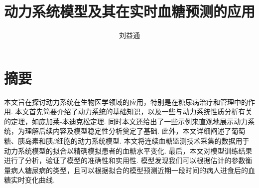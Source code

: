 \confidential{}%
\title{动力系统模型及其在实时血糖预测的应用}%
\author{刘益通}%
\advisorsec{}%
\englishdate{\quad / \quad /\quad}%

\chapter*{摘\quad 要}%
\setcounter{page}{1}%

本文旨在探讨动力系统在生物医学领域的应用，特别是在糖尿病治疗和管理中的作用. 本文首先简要介绍了动力系统的基础知识，以及一些与动力系统性质分析有关的定理，如庞加莱-本迪克松定理. 同时本文还给出了一些示例来直观地展示动力系统，为理解后续内容及模型稳定性分析奠定了基础. 此外，本文详细阐述了葡萄糖、胰岛素和胰$\beta$细胞的动力系统模型. 本文将连续血糖监测技术采集的数据用于动力系统模型的拟合以精确模拟患者的血糖水平变化. 最后，本文对模型训练结果进行了分析，验证了模型的准确性和实用性. 模型发现我们可以根据估计的参数衡量病人糖尿病的类型，且可以根据拟合的模型预测近期一段时间的病人进食后的血糖实时变化曲线. 



